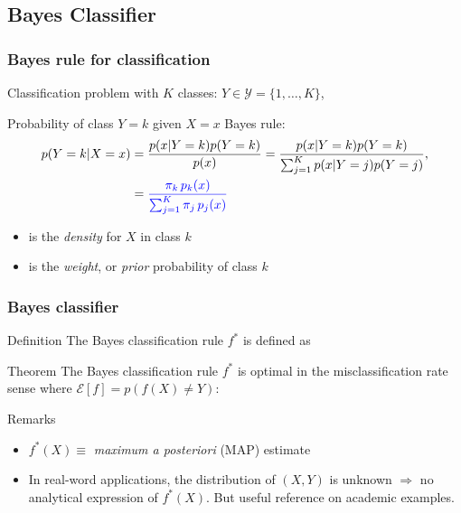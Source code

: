 \subsection{Bayes Classifier}

\begin{frame}
  \frametitle{Bayes rule for classification}
   
   
Classification problem with $K$ classes: $Y \in \mathcal{Y}=\{1,\ldots,K\}$,

\begin{block}{Probability of class $Y=k$ given $X=x$}  
Bayes rule:
  \begin{align*}
 p{(Y=k|X=x)} &=  \frac{ p(x| Y=k)p{(Y=k)} } { p(x) } =
  \frac{p(x| Y=k)p{(Y=k)} } { \sum_{j=1}^K p(x|Y=j)p{(Y=j)}  },\\  
  & = {\textcolor{blue}{ \frac{  \pi_k \,  p_k(x) } { \sum_{j=1}^K  \pi_j \,  p_j(x)   } }}
 \end{align*}
 \begin{itemize}
  \item {} is the {\em density} for $X$ in class $k$
  \item {} is the {\em weight}, or {\em prior} probability of class $k$  
 \end{itemize}
\end{block}

\end{frame}


\begin{frame}
  \frametitle{Bayes classifier}
  
  \begin{block}{Definition}
  The Bayes classification rule $f^{\ast}$ is defined as
   \end{block}
 \begin{block}{Theorem}
 The Bayes classification rule $f^{\ast}$ is optimal in the misclassification rate sense where $\mathcal{E}[f]=p( f(X)  \ne Y)$: 
 \end{block}
  \begin{block}{Remarks}
   \begin{itemize}
    \item $f^{\ast}(X) \equiv$  {\it maximum a posteriori} (MAP) estimate
    \item In real-word applications,  the distribution of $(X,Y)$ is unknown $\Rightarrow$ no analytical expression  of $f^{\ast}(X)$. 
    But useful reference on academic examples.
   \end{itemize}

 \end{block}
\end{frame}




